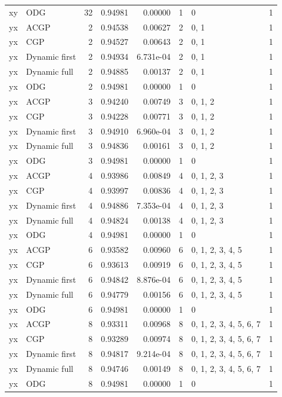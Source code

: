 \documentclass[10pt,a4paper]{article}
\begin{document}
\begin{longtable}{@{}p{23mm}p{29mm}rrrrp{36mm}r@{}}
xy & ODG & 32 & 0.94981 & 0.00000 & 1 & 0 & 1 \\
yx & ACGP & 2 & 0.94538 & 0.00627 & 2 & 0, 1 & 1 \\
yx & CGP & 2 & 0.94527 & 0.00643 & 2 & 0, 1 & 1 \\
yx & Dynamic first & 2 & 0.94934 & 6.731e-04 & 2 & 0, 1 & 1 \\
yx & Dynamic full & 2 & 0.94885 & 0.00137 & 2 & 0, 1 & 1 \\
yx & ODG & 2 & 0.94981 & 0.00000 & 1 & 0 & 1 \\
yx & ACGP & 3 & 0.94240 & 0.00749 & 3 & 0, 1, 2 & 1 \\
yx & CGP & 3 & 0.94228 & 0.00771 & 3 & 0, 1, 2 & 1 \\
yx & Dynamic first & 3 & 0.94910 & 6.960e-04 & 3 & 0, 1, 2 & 1 \\
yx & Dynamic full & 3 & 0.94836 & 0.00161 & 3 & 0, 1, 2 & 1 \\
yx & ODG & 3 & 0.94981 & 0.00000 & 1 & 0 & 1 \\
yx & ACGP & 4 & 0.93986 & 0.00849 & 4 & 0, 1, 2, 3 & 1 \\
yx & CGP & 4 & 0.93997 & 0.00836 & 4 & 0, 1, 2, 3 & 1 \\
yx & Dynamic first & 4 & 0.94886 & 7.353e-04 & 4 & 0, 1, 2, 3 & 1 \\
yx & Dynamic full & 4 & 0.94824 & 0.00138 & 4 & 0, 1, 2, 3 & 1 \\
yx & ODG & 4 & 0.94981 & 0.00000 & 1 & 0 & 1 \\
yx & ACGP & 6 & 0.93582 & 0.00960 & 6 & 0, 1, 2, 3, 4, 5 & 1 \\
yx & CGP & 6 & 0.93613 & 0.00919 & 6 & 0, 1, 2, 3, 4, 5 & 1 \\
yx & Dynamic first & 6 & 0.94842 & 8.876e-04 & 6 & 0, 1, 2, 3, 4, 5 & 1 \\
yx & Dynamic full & 6 & 0.94779 & 0.00156 & 6 & 0, 1, 2, 3, 4, 5 & 1 \\
yx & ODG & 6 & 0.94981 & 0.00000 & 1 & 0 & 1 \\
yx & ACGP & 8 & 0.93311 & 0.00968 & 8 & 0, 1, 2, 3, 4, 5, 6, 7 & 1 \\
yx & CGP & 8 & 0.93289 & 0.00974 & 8 & 0, 1, 2, 3, 4, 5, 6, 7 & 1 \\
yx & Dynamic first & 8 & 0.94817 & 9.214e-04 & 8 & 0, 1, 2, 3, 4, 5, 6, 7 & 1 \\
yx & Dynamic full & 8 & 0.94746 & 0.00149 & 8 & 0, 1, 2, 3, 4, 5, 6, 7 & 1 \\
yx & ODG & 8 & 0.94981 & 0.00000 & 1 & 0 & 1 \\

\end{longtable}
\end{document}
